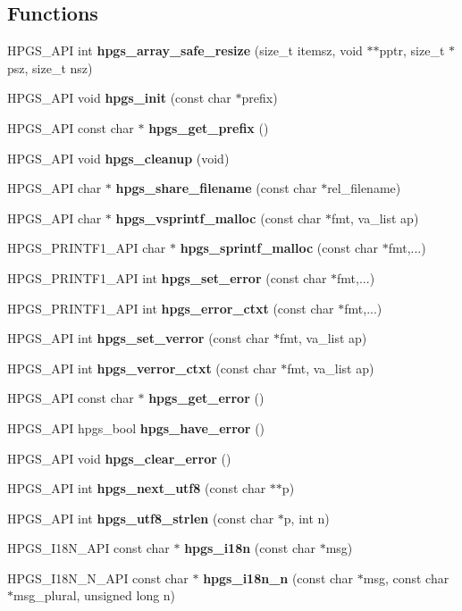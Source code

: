 \subsection*{Functions}
\begin{DoxyCompactItemize}
\item 
HPGS\_\-API int {\bf hpgs\_\-array\_\-safe\_\-resize} (size\_\-t itemsz, void $\ast$$\ast$pptr, size\_\-t $\ast$psz, size\_\-t nsz)
\item 
HPGS\_\-API void {\bf hpgs\_\-init} (const char $\ast$prefix)
\item 
HPGS\_\-API const char $\ast$ {\bf hpgs\_\-get\_\-prefix} ()
\item 
HPGS\_\-API void {\bf hpgs\_\-cleanup} (void)
\item 
HPGS\_\-API char $\ast$ {\bf hpgs\_\-share\_\-filename} (const char $\ast$rel\_\-filename)
\item 
HPGS\_\-API char $\ast$ {\bf hpgs\_\-vsprintf\_\-malloc} (const char $\ast$fmt, va\_\-list ap)
\item 
HPGS\_\-PRINTF1\_\-API char $\ast$ {\bf hpgs\_\-sprintf\_\-malloc} (const char $\ast$fmt,...)
\item 
HPGS\_\-PRINTF1\_\-API int {\bf hpgs\_\-set\_\-error} (const char $\ast$fmt,...)
\item 
HPGS\_\-PRINTF1\_\-API int {\bf hpgs\_\-error\_\-ctxt} (const char $\ast$fmt,...)
\item 
HPGS\_\-API int {\bf hpgs\_\-set\_\-verror} (const char $\ast$fmt, va\_\-list ap)
\item 
HPGS\_\-API int {\bf hpgs\_\-verror\_\-ctxt} (const char $\ast$fmt, va\_\-list ap)
\item 
HPGS\_\-API const char $\ast$ {\bf hpgs\_\-get\_\-error} ()
\item 
HPGS\_\-API hpgs\_\-bool {\bf hpgs\_\-have\_\-error} ()
\item 
HPGS\_\-API void {\bf hpgs\_\-clear\_\-error} ()
\item 
HPGS\_\-API int {\bf hpgs\_\-next\_\-utf8} (const char $\ast$$\ast$p)
\item 
HPGS\_\-API int {\bf hpgs\_\-utf8\_\-strlen} (const char $\ast$p, int n)
\item 
HPGS\_\-I18N\_\-API const char $\ast$ {\bfseries hpgs\_\-i18n} (const char $\ast$msg)\label{group__base_ga3b14be33eec8c80d111a4394efcbf008}

\item 
HPGS\_\-I18N\_\-N\_\-API const char $\ast$ {\bfseries hpgs\_\-i18n\_\-n} (const char $\ast$msg, const char $\ast$msg\_\-plural, unsigned long n)\label{group__base_gac841286219f60f4198b3fb3c869f9e5e}


\end{DoxyCompactItemize}
